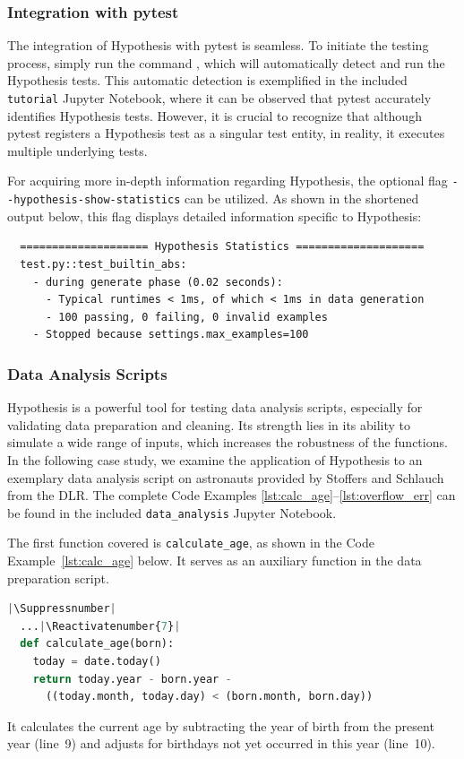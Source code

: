 \documentclass[runningheads]{llncs}
\makeatletter
\let\origthelstnumber\thelstnumber
\newcommand*\Suppressnumber{%
  \lst@AddToHook{OnNewLine}{%
    \let\thelstnumber\relax%
     \advance\c@lstnumber-\@ne\relax%
    }%
}
\newcommand*\Reactivatenumber[1]{%
  \setcounter{lstnumber}{\numexpr#1-1\relax}
  \lst@AddToHook{OnNewLine}{%
   \let\thelstnumber\origthelstnumber%
   \refstepcounter{lstnumber}%
  }%
}
\makeatother
\begin{document}
\subsubsection{Integration with pytest}
The integration of Hypothesis with pytest is seamless. To initiate the testing process, simply run the command , which will automatically detect and run the Hypothesis tests. This automatic detection is exemplified in the included \texttt{tutorial} Jupyter Notebook, where it can be observed that pytest accurately identifies Hypothesis tests. However, it is crucial to recognize that although pytest registers a Hypothesis test as a singular test entity, in reality, it executes multiple underlying tests.

\vspace{5mm}
\noindent For acquiring more in-depth information regarding Hypothesis, the optional flag \texttt{-{}-hypothesis-show-statistics} can be utilized. As shown in the shortened output below, this flag displays detailed information specific to Hypothesis:
\begin{verbatim}
  ==================== Hypothesis Statistics ====================
  test.py::test_builtin_abs:
    - during generate phase (0.02 seconds):
      - Typical runtimes < 1ms, of which < 1ms in data generation
      - 100 passing, 0 failing, 0 invalid examples
    - Stopped because settings.max_examples=100
\end{verbatim}

\subsubsection{Data Analysis Scripts}
Hypothesis is a powerful tool for testing data analysis scripts, especially for validating data preparation and cleaning. Its strength lies in its ability to simulate a wide range of inputs, which increases the robustness of the functions. In the following case study, we examine the application of Hypothesis to an exemplary data analysis script on astronauts provided by Stoffers and Schlauch~\cite{Stoffers2021} from the DLR. The complete Code Examples \ref{lst:calc_age}--\ref{lst:overflow_err} can be found in the included \texttt{data\_analysis} Jupyter Notebook.

\newpage
\noindent The first function covered is \texttt{calculate\_age}, as shown in the Code Example~\ref{lst:calc_age} below. It serves as an auxiliary function in the data preparation script.

\begin{lstlisting}[language=Python,caption={Calculate Age from \texttt{data\_analysis.ipynb}},label=lst:calc_age]
  |\Suppressnumber|
  ...|\Reactivatenumber{7}|
  def calculate_age(born):
    today = date.today()
    return today.year - born.year -
      ((today.month, today.day) < (born.month, born.day))
\end{lstlisting}
It calculates the current age by subtracting the year of birth from the present year (line~9) and adjusts for birthdays not yet occurred in this year (line~10).
\end{document}
